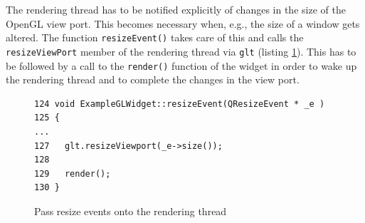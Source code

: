 \documentclass[jou,noapacite]{apa}
\begin{document}
%
The rendering thread has to be notified explicitly of changes in the size of
the OpenGL view port.
%
This becomes necessary when, e.g., the size of a window gets altered.
%
The function \lstinline|resizeEvent()| takes care of this and calls
the \lstinline|resizeViewPort| member of the rendering thread
via \lstinline|glt| (listing \ref{lst:resize}).
%
This has to be followed by a call to the \lstinline|render()| function of the
widget in order to wake up the rendering thread and to complete the changes in
the view port.
%
\begin{figure}[h]
\begin{lstlisting}[basicstyle=\scriptsize]
124 void ExampleGLWidget::resizeEvent(QResizeEvent * _e )
125 {
...
127   glt.resizeViewport(_e->size());
128
129   render();
130 }
\end{lstlisting}
\caption{Pass resize events onto the rendering thread}
\label{lst:resize}
\end{figure}
\end{document}
